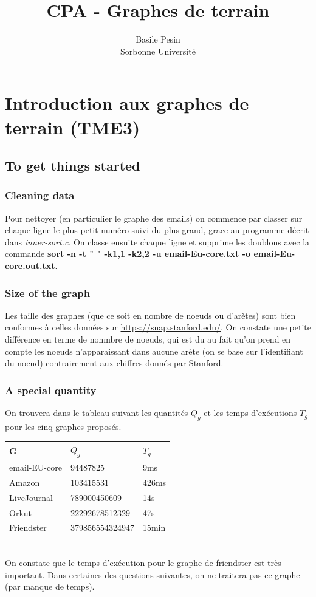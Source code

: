 \documentclass[a4paper]{report}
\title{CPA - Graphes de terrain}
\author{Basile Pesin\\Sorbonne Université}
\begin{document}
\maketitle

\chapter{Introduction aux graphes de terrain (TME3)}

\section{To get things started}

\subsection*{Cleaning data}
Pour nettoyer (en particulier le graphe des emails) on commence par classer sur chaque ligne le plus petit numéro suivi du plus grand, grace au programme décrit dans \textit{inner-sort.c}. On classe ensuite chaque ligne et supprime les doublons avec la commande \textbf{sort -n -t " " -k1,1 -k2,2 -u email-Eu-core.txt -o email-Eu-core.out.txt}.

\subsection*{Size of the graph}
Les taille des graphes (que ce soit en nombre de noeuds ou d'arètes) sont bien conformes à celles données sur \url{https://snap.stanford.edu/}. On constate une petite différence en terme de nonmbre de noeuds, qui est du au fait qu'on prend en compte les noeuds n'apparaissant dans aucune arète (on se base sur l'identifiant du noeud) contrairement aux chiffres donnés par Stanford.

\subsection*{A special quantity}
On trouvera dans le tableau suivant les quantités $Q_g$ et les temps d'exécutions $T_g$ pour les cinq graphes proposés.

\begin{tabular}{|l|l|l|}
  \hline
  G & $Q_g$ & $T_g$ \\
  \hline
  email-EU-core & 94487825 & 9ms\\
  Amazon & 103415531 & 426ms \\
  LiveJournal & 789000450609 & 14s \\
  Orkut & 22292678512329 & 47s \\
  Friendster & 379856554324947 & 15min \\
  \hline
\end{tabular}\\
On constate que le temps d'exécution pour le graphe de friendster est très important. Dans certaines des questions suivantes, on ne traitera pas ce graphe (par manque de temps).
\end{document}
